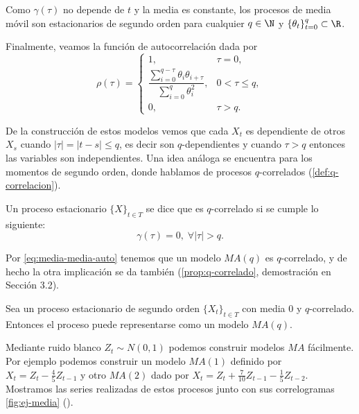 Como $\gamma(\tau)$ no depende de $t$ y la media es constante, los procesos de media móvil son estacionarios de segundo orden para cualquier $q \in \N$ y $\{\theta_t\}_{t = 0}^q \subset \R$.

Finalmente, veamos la función de autocorrelación dada por
\begin{equation*}
  \rho(\tau) = \begin{cases}
    1, & \tau = 0, \\
    \dfrac{\sum \limits^{q - \tau}_{i = 0} \theta_i \theta_{i + \tau}}{\sum \limits^q_{i = 0} \theta_i^2}, & 0 < \tau \leq q, \\
    0, & \tau > q.
  \end{cases}
  \label{eq:media-autocor}
\end{equation*}

De la construcción de estos modelos vemos que cada $X_t$ es dependiente de otros $X_s$ cuando $|\tau| = |t-s| \leq q$, es decir son $q$-dependientes y cuando $\tau > q$ entonces las variables son independientes. Una idea análoga se encuentra para los momentos de segundo orden, donde hablamos de procesos $q$-correlados (\autoref{def:q-correlacion}).

\begin{definicion}
  Un proceso estacionario $\{X\}_{t \in T}$ se dice que es $q$-correlado si se cumple lo siguiente:
  $$\gamma(\tau) = 0, \; \forall |\tau| > q.$$
  \label{def:q-correlacion}
\end{definicion}

Por \eqref{eq:media-media-auto} tenemos que un modelo $MA(q)$ es $q$-correlado, y de hecho la otra implicación se da también (\autoref{prop:q-correlado}, demostración en \cite{brockwell1991time} Sección 3.2).

\begin{proposicion}
  Sea un proceso estacionario de segundo orden $\{X_t\}_{t \in T}$ con media 0 y $q$-correlado. Entonces el proceso puede representarse como un modelo $MA(q)$.
\label{prop:q-correlado}
\end{proposicion}

Mediante ruido blanco $Z_t \sim N(0, 1)$ podemos construir modelos $MA$ fácilmente. Por ejemplo podemos construir un modelo $MA(1)$ definido por $X_t = Z_t - \frac{4}{5}Z_{t - 1}$ y otro $MA(2)$ dado por $X_t = Z_t + \frac{7}{10} Z_{t - 1} - \frac{1}{5}Z_{t - 2}$. Mostramos las series realizadas de estos procesos junto con sus correlogramas \autoref{fig:ej-media} (\cite{chatfield2019analysis}).

